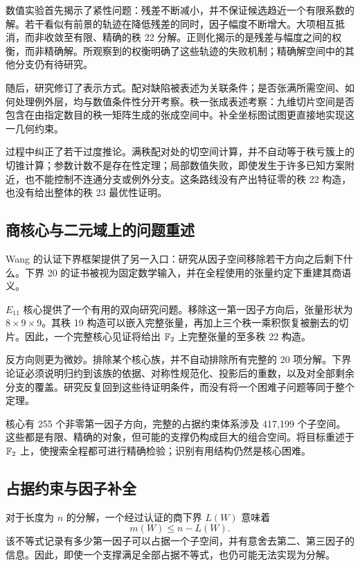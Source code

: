 数值实验首先揭示了紧性问题：残差不断减小，并不保证候选趋近一个有限系数的解。若干看似有前景的轨迹在降低残差的同时，因子幅度不断增大。大项相互抵消，而非收敛至有限、精确的秩 22 分解。正则化揭示的是残差与幅度之间的权衡，而非精确解。所观察到的权衡明确了这些轨迹的失败机制；精确解空间中的其他分支仍有待研究。

随后，研究修订了表示方式。配对缺陷被表述为关联条件；是否张满所需空间、如何处理例外层，均与数值条件性分开考察。秩一张成表述考察：九维切片空间是否包含在由指定数目的秩一矩阵生成的张成空间中。补全坐标图试图更直接地实现这一几何约束。

过程中纠正了若干过度推论。满秩配对处的切空间计算，并不自动等于秩亏簇上的切锥计算；参数计数不是存在性定理；局部数值失败，即使发生于许多已知方案附近，也不能控制不连通分支或例外分支。这条路线没有产出特征零的秩 22 构造，也没有给出整体的秩 23 最优性证明。

\subsection{商核心与二元域上的问题重述}\label{route:cores}

Wang 的认证下界框架提供了另一入口：研究从因子空间移除若干方向之后剩下什么\cite{wangautomated}。下界 20 的证书被视为固定数学输入，并在全程使用的张量约定下重建其商语义。

$E_{11}$ 核心提供了一个有用的双向研究问题。移除这一第一因子方向后，张量形状为 $8\times9\times9$。其秩 19 构造可以嵌入完整张量，再加上三个秩一乘积恢复被删去的切片。因此，一个完整核心见证将给出 $\mathbb{F}_2$ 上完整张量的至多秩 22 构造。

反方向则更为微妙。排除某个核心族，并不自动排除所有完整的 20 项分解。下界论证必须说明归约到该族的依据、对称性规范化、投影后的重数，以及对全部剩余分支的覆盖。研究反复回到这些待证明条件，而没有将一个困难子问题等同于整个定理。

核心有 255 个非零第一因子方向，完整的占据约束体系涉及 417,199 个子空间。这些都是有限、精确的对象，但可能的支撑仍构成巨大的组合空间。将目标重述于 $\mathbb{F}_2$ 上，使搜索全程都可进行精确检验；识别有用结构仍然是核心困难。

\subsection{占据约束与因子补全}\label{route:completion}

对于长度为 $n$ 的分解，一个经过认证的商下界 $L(W)$ 意味着
\[
 m(W)\le n-L(W).
\]
该不等式记录有多少第一因子可以占据一个子空间，并有意舍去第二、第三因子的信息。因此，即使一个支撑满足全部占据不等式，也仍可能无法实现为分解。

